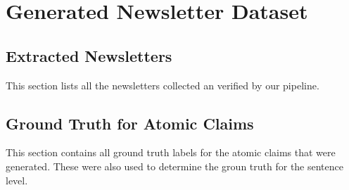 \chapter{Generated Newsletter Dataset}\label{appendix}

\section{Extracted Newsletters}
This section lists all the newsletters collected an verified by our pipeline. 


\section{Ground Truth for Atomic Claims}
This section contains all ground truth labels for the atomic claims that were generated. These were also used to determine the groun truth for the sentence level. 

